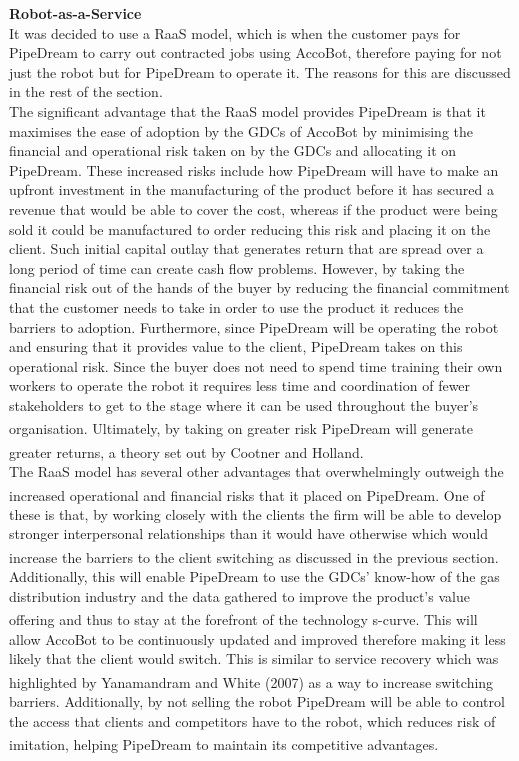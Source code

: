 \documentclass[11pt]{article}		%
\newcommand{\supercite}[1]{\textsuperscript{\cite{#1}}}		%
\begin{document}
            \textbf{Robot-as-a-Service}%
            \\
            It was decided to use a RaaS model, which is when the customer pays for PipeDream to carry out contracted jobs using AccoBot, therefore paying for not just the robot but for PipeDream to operate it. The reasons for this are discussed in the rest of the section.
            \\ 
            \hspace*{3ex}The significant advantage that the RaaS model provides PipeDream is that it maximises the ease of adoption by the GDCs of AccoBot by minimising the financial and operational risk taken on by the GDCs and allocating it on PipeDream. These increased risks include how PipeDream will have to make an upfront investment in the manufacturing of the product before it has secured a revenue that would be able to cover the cost, whereas if the product were being sold it could be manufactured to order reducing this risk and placing it on the client. Such initial capital outlay that generates return that are spread over a long period of time can create cash flow problems. However, by taking the financial risk out of the hands of the buyer by reducing the financial commitment that the customer needs to take in order to use the product it reduces the barriers to adoption. Furthermore, since PipeDream will be operating the robot and ensuring that it provides value to the client, PipeDream takes on this operational risk. Since the buyer does not need to spend time training their own workers to operate the robot it requires less time and coordination of fewer stakeholders to get to the stage where it can be used throughout the buyer’s organisation.\supercite{RaaS} Ultimately, by taking on greater risk PipeDream will generate greater returns, a theory set out by Cootner and Holland\supercite{risk-return}.
            \\
            \hspace*{3ex}The RaaS model has several other advantages that overwhelmingly outweigh the increased operational and financial risks that it placed on PipeDream.\supercite{RaaS} One of these is that, by working closely with the clients the firm will be able to develop stronger interpersonal relationships than it would have otherwise which would increase the barriers to the client switching\supercite{B2Brelations} as discussed in the previous section. Additionally, this will enable PipeDream to use the GDCs' know-how of the gas distribution industry and the data gathered to improve the product’s value offering and thus to stay at the forefront of the technology s-curve.\supercite{Barney} This will allow AccoBot to be continuously updated and improved therefore making it less likely that the client would switch. This is similar to service recovery which was highlighted by Yanamandram and White (2007)\supercite{customers} as a way to increase switching barriers. Additionally, by not selling the robot PipeDream will be able to control the access that clients and competitors have to the robot, which reduces risk of imitation, helping PipeDream to maintain its competitive advantages.\supercite{Barney}
\end{document}
